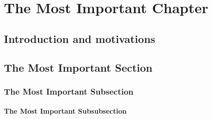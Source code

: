 \documentclass[debug]{phd}
\begin{document}
	\chapter{The Most Important Chapter}
	\label{chapEGG}
		\section{Introduction and motivations}
			
		\section{The Most Important Section}
				\subsection{The Most Important Subsection}
						
					\subsubsection{The Most Important Subsubsection}

\end{document}
